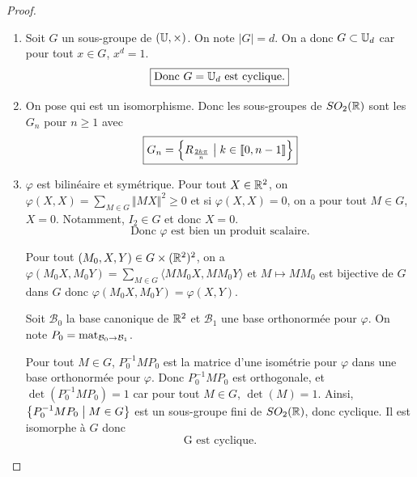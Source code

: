 \begin{proof}
	\phantom{}
	\begin{enumerate}
		\item Soit $G$ un sous-groupe de $(\mathbb{U},\times)$. On note $\vert G\vert=d$. On a donc $G\subset\mathbb{U}_{d}$ car pour tout $x\in G$, $x^{d}=1$. 
		\begin{equation}
			\boxed{\text{Donc }G=\mathbb{U}_{d}\text{ est cyclique.}}
		\end{equation}
		
		\item On pose 
		qui est un isomorphisme. Donc les sous-groupes de $SO_{2}(\mathbb{R})$ sont les $G_{n}$ pour $n\geqslant1$ avec 
		\begin{equation}
			\boxed{
			G_{n}=\left\{R_{\frac{2k\pi}{n}}\bigm| k\in\left\llbracket 0,n-1\right\rrbracket\right\}}
		\end{equation}

		\item $\varphi$ est bilinéaire et symétrique. Pour tout $X\in\mathbb{R}^{2}$, on $\varphi(X,X)=\sum_{M\in G}\Vert MX\Vert^{2}\geqslant0$ et si $\varphi(X,X)=0$, on a pour tout $M\in G$, $X=0$. Notamment, $I_{2}\in G$ et donc $X=0$. 
		\begin{equation}
			\boxed{\text{Donc }\varphi\text{ est bien un produit scalaire.}}
		\end{equation}
		
		Pour tout $(M_{0},X,Y)\in G\times(\mathbb{R}^{2})^{2}$, on a $\varphi(M_{0}X,M_{0}Y)=\sum_{M\in G}\langle MM_{0}X,MM_{0}Y\rangle$
		et $M\mapsto MM_{0}$ est bijective de $G$ dans $G$ donc $\varphi(M_{0}X,M_{0}Y)=\varphi(X,Y)$.

		Soit $\mathcal{B}_{0}$ la base canonique de $\mathbb{R}^{2}$ et $\mathcal{B}_{1}$ une base orthonormée pour $\varphi$. On note $P_{0}=\operatorname{mat}\limits_{\mathcal{B}_{0}\to \mathcal{B}_{1}}$. 
		
		Pour tout $M\in G$, $P_{0}^{-1}MP_{0}$ est la matrice d'une isométrie pour $\varphi$ dans une base orthonormée pour $\varphi$. Donc $P_{0}^{-1}MP_{0}$ est orthogonale, et $\det(P_{0}^{-1}MP_{0})=1$ car pour tout $M\in G$, $\det(M)=1$. Ainsi, $\left\{P_{0}^{-1}MP_{0}\bigm| M\in G\right\}$ est un sous-groupe fini de $SO_{2}(\mathbb{R})$, donc cyclique. Il est isomorphe à $G$ donc 
		\begin{equation}
			\boxed{\text{G est cyclique.}}
		\end{equation}
	\end{enumerate}
\end{proof}

